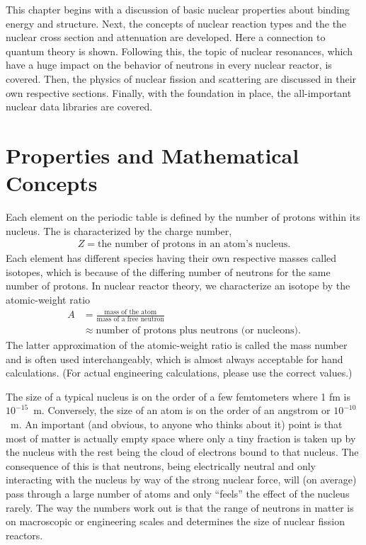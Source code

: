This chapter begins with a discussion of basic nuclear properties about binding energy and structure. Next, the concepts of nuclear reaction types and the the nuclear cross section and attenuation are developed. Here a connection to quantum theory is shown. Following this, the topic of nuclear resonances, which have a huge impact on the behavior of neutrons in every nuclear reactor, is covered. Then, the physics of nuclear fission and scattering are discussed in their own respective sections. Finally, with the foundation in place, the all-important nuclear data libraries are covered.

\section{Properties and Mathematical Concepts}

Each element on the periodic table is defined by the number of protons within its nucleus. The is characterized by the charge number,
\begin{align}
  Z = \text{the number of protons in an atom's nucleus.} \nonumber
\end{align}
Each element has different species having their own respective masses called isotopes, which is because of the differing number of neutrons for the same number of protons. In nuclear reactor theory, we characterize an isotope by the atomic-weight ratio
\begin{align}
  A &= \frac{\text{mass of the atom}}{\text{mass of a free neutron}} \nonumber \\
    &\approx \text{number of protons plus neutrons (or nucleons)} . \nonumber
\end{align}
The latter approximation of the atomic-weight ratio is called the mass number and is often used interchangeably, which is almost always acceptable for hand calculations. (For actual engineering calculations, please use the correct values.)

The size of a typical nucleus is on the order of a few femtometers where 1 fm is $10^{-15}$~m. Conversely, the size of an atom is on the order of an angstrom or $10^{-10}$~m. An important (and obvious, to anyone who thinks about it) point is that most of matter is actually empty space where only a tiny fraction is taken up by the nucleus with the rest being the cloud of electrons bound to that nucleus. The consequence of this is that neutrons, being electrically neutral and only interacting with the nucleus by way of the strong nuclear force, will (on average) pass through a large number of atoms and only ``feels'' the effect of the nucleus rarely. The way the numbers work out is that the range of neutrons in matter is on macroscopic or engineering scales and determines the size of nuclear fission reactors.

